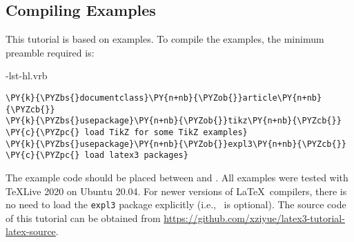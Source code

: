 \documentclass{ltugboat}
\begin{document}
\subsection{Compiling Examples}
This tutorial is based on examples.
To compile the examples, the minimum preamble required is:
\def\CurrentEnvName{latexsample**}
\begin{filecontents}{\jobname-lst-hl.vrb}
\begin{Verbatim}[commandchars=\\\{\}]
\PY{k}{\PYZbs{}documentclass}\PY{n+nb}{\PYZob{}}article\PY{n+nb}{\PYZcb{}}
\PY{k}{\PYZbs{}usepackage}\PY{n+nb}{\PYZob{}}tikz\PY{n+nb}{\PYZcb{}} \PY{c}{\PYZpc{} load TikZ for some TikZ examples}
\PY{k}{\PYZbs{}usepackage}\PY{n+nb}{\PYZob{}}expl3\PY{n+nb}{\PYZcb{}} \PY{c}{\PYZpc{} load latex3 packages}
\end{Verbatim}
\end{filecontents}
\noindent The example code should be placed between  
and . 
All examples were tested with \TeX Live  2020 on Ubuntu 20.04.
For newer versions of \LaTeX~compilers, there is no need to load the \verb|expl3| package explicitly (i.e., \footnotemark~is optional).
The source code of this tutorial can be obtained from \url{https://github.com/xziyue/latex3-tutorial-latex-source}.
\end{document}
